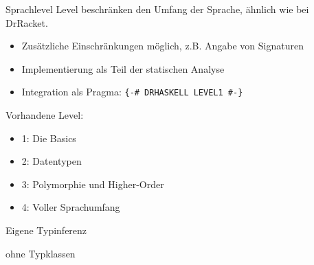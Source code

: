 \begin{frame}{Sprachlevel}
	Level beschränken den Umfang der Sprache, ähnlich wie bei DrRacket.
	\begin{itemize}
		\item Zusätzliche Einschränkungen  möglich, z.B. Angabe von Signaturen
		\item Implementierung als Teil der statischen Analyse
		\item Integration als Pragma: \texttt{\{-\# DRHASKELL LEVEL1 \#-\}}
	\end{itemize}
	Vorhandene Level: \par
	\begin{minipage}[T]{.55 \textwidth}
		\begin{itemize}
			\item 1: Die Basics
			\item 2: Datentypen
			\item 3: Polymorphie und Higher-Order
			\item 4: Voller Sprachumfang
		\end{itemize}
	\end{minipage}
	\begin{minipage}[T]{.4 \textwidth}
			\scalebox{5}{\}} Eigene Typinferenz \par \qquad \quad ohne Typklassen
	\end{minipage}
\end{frame}